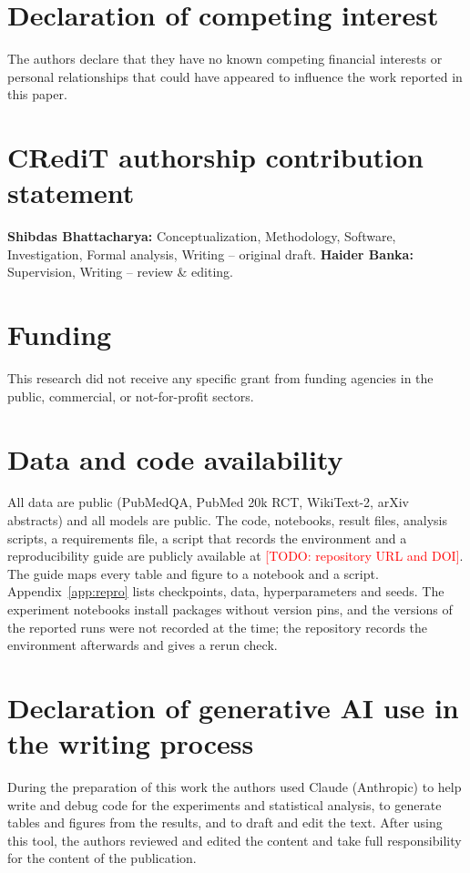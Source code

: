 \documentclass[preprint,12pt]{elsarticle}
\newcommand{\todo}[1]{\textcolor{red}{[TODO: #1]}}   %
\begin{document}
\section*{Declaration of competing interest}
The authors declare that they have no known competing financial interests or personal relationships that could have appeared to influence the work reported in this paper.

\section*{CRediT authorship contribution statement}
\textbf{Shibdas Bhattacharya:} Conceptualization, Methodology, Software, Investigation, Formal analysis, Writing -- original draft. \textbf{Haider Banka:} Supervision, Writing -- review \& editing.

\section*{Funding}
This research did not receive any specific grant from funding agencies in the public, commercial, or not-for-profit sectors.

\section*{Data and code availability}
All data are public (PubMedQA, PubMed 20k RCT, WikiText-2, arXiv abstracts) and all models are public. The code, notebooks, result files, analysis scripts, a requirements file, a script that records the environment and a reproducibility guide are publicly available at \todo{repository URL and DOI}. The guide maps every table and figure to a notebook and a script. Appendix~\ref{app:repro} lists checkpoints, data, hyperparameters and seeds. The experiment notebooks install packages without version pins, and the versions of the reported runs were not recorded at the time; the repository records the environment afterwards and gives a rerun check.

\section*{Declaration of generative AI use in the writing process}
During the preparation of this work the authors used Claude (Anthropic) to help write and debug code for the experiments and statistical analysis, to generate tables and figures from the results, and to draft and edit the text. After using this tool, the authors reviewed and edited the content and take full responsibility for the content of the publication.
\end{document}

